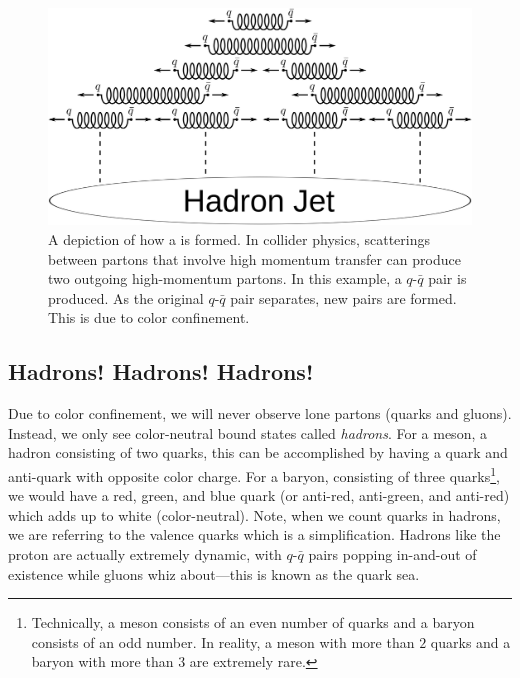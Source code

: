 \documentclass[../main.tex]{subfiles}
\begin{document}
\begin{figure}[h]
    \centering
    \includegraphics[scale=0.1]{introduction/figs/confinement.png}
    \caption{A depiction of how a  is formed. In collider physics, scatterings between partons that involve high momentum transfer can produce two outgoing high-momentum partons. In this example, a $q$-$\bar{q}$ pair is produced. As the original $q$-$\bar{q}$ pair separates, new pairs are formed. This is due to color confinement.}
    \label{fig:confinement}
\end{figure}



\subsection{Hadrons! Hadrons! Hadrons!}
Due to color confinement, we will never observe lone partons (quarks and gluons). Instead, we only see color-neutral bound states called \textit{hadrons}. For a meson, a hadron consisting of two quarks, this can be accomplished by having a quark and anti-quark with opposite color charge. For a baryon, consisting of three quarks\footnote{Technically, a meson consists of an even number of quarks and a baryon consists of an odd number. In reality, a meson with more than $2$ quarks and a baryon with more than $3$ are extremely rare.}, we would have a red, green, and blue quark (or anti-red, anti-green, and anti-red) which adds up to white (color-neutral). Note, when we count quarks in hadrons, we are referring to the valence quarks which is a simplification. Hadrons like the proton are actually extremely dynamic, with $q$-$\bar{q}$ pairs popping in-and-out of existence while gluons whiz about---this is known as the quark sea. 
\end{document}
